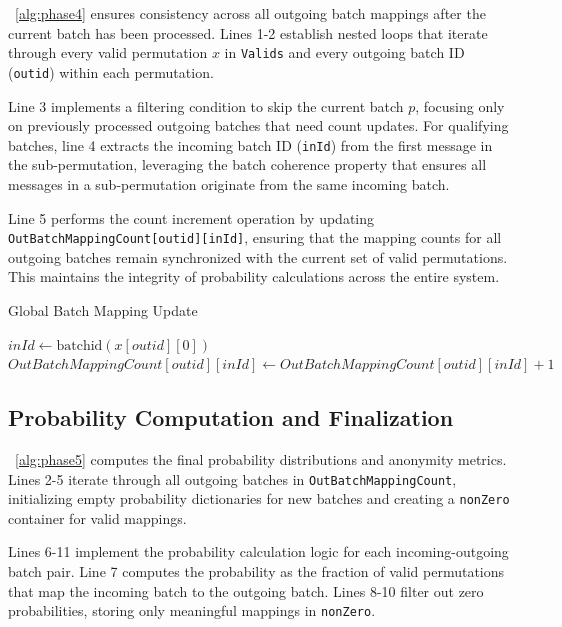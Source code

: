 \documentclass{article}
\begin{document}
~\ref{alg:phase4} ensures consistency 
across all outgoing batch mappings after the 
current batch has been processed. Lines 1-2 
establish nested loops that iterate through 
every valid permutation $x$ in \texttt{Valids} 
and every outgoing batch ID (\texttt{outid}) 
within each permutation.

Line 3 implements a filtering condition to 
skip the current batch $p$, focusing only on 
previously processed outgoing batches that 
need count updates. For qualifying batches, 
line 4 extracts the incoming batch ID (\texttt{inId}) 
from the first message in the sub-permutation, leveraging 
the batch coherence property that ensures all 
messages in a sub-permutation originate from 
the same incoming batch.

Line 5 performs the count increment 
operation by updating \texttt{OutBatchMappingCount[outid][inId]}, 
ensuring that the mapping counts for all 
outgoing batches remain synchronized with 
the current set of valid permutations. 
This maintains the integrity of probability 
calculations across the entire system.


\begin{algorithm}[H]
\caption{Global Batch Mapping Update}
\label{alg:phase4}
\begin{algorithmic}[1]
            \State $ inId \gets \text{batchid}(x[outid][0])$
            \State $ OutBatchMappingCount[outid][inId] \gets OutBatchMappingCount[outid][inId] + 1$
        \EndIf
    \EndFor
\EndFor
\end{algorithmic}
\end{algorithm}

\subsection{Probability Computation and Finalization}

~\ref{alg:phase5} computes the final 
probability distributions and anonymity 
metrics. Lines 2-5 iterate through all 
outgoing batches in \texttt{OutBatchMappingCount}, 
initializing empty probability dictionaries for 
new batches and creating a \texttt{nonZero} 
container for valid mappings.

Lines 6-11 implement the probability calculation 
logic for each incoming-outgoing batch pair. 
Line 7 computes the probability as the fraction of 
valid permutations that map 
the incoming batch to the outgoing batch. 
Lines 8-10 filter out zero probabilities, 
storing only meaningful mappings in \texttt{nonZero}.
\end{document}
